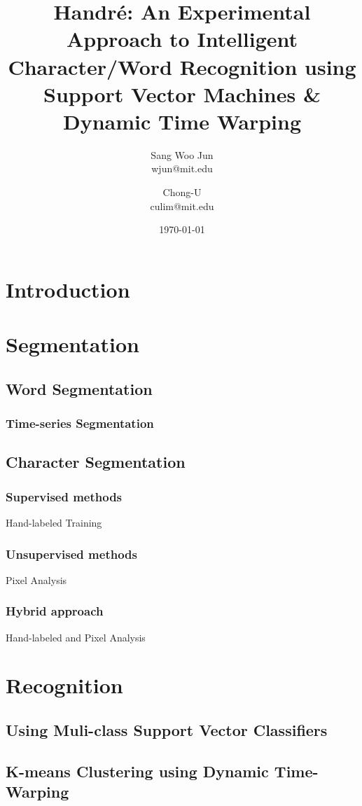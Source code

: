 \documentclass[12pt]{article}
\title{Handr\'{e}: An Experimental Approach to Intelligent Character/Word Recognition using Support Vector Machines \& Dynamic Time Warping}
\date{\today}
\author{
	Sang Woo Jun \\ 
	wjun@mit.edu \\ 
  \and
  Chong-U \\
  culim@mit.edu
}
\begin{document}
\maketitle



\section{Introduction}

\section{Segmentation}
	\subsection{Word Segmentation}
		\subsubsection{Time-series Segmentation}
	\subsection{Character Segmentation}
		\subsubsection{Supervised methods}
			Hand-labeled Training
		\subsubsection{Unsupervised methods}
			Pixel Analysis
		\subsubsection{Hybrid approach}
			Hand-labeled and Pixel Analysis
			
\section{Recognition}
	\subsection{Using Muli-class Support Vector Classifiers}
	\subsection{K-means Clustering using Dynamic Time-Warping}
\end{document}
